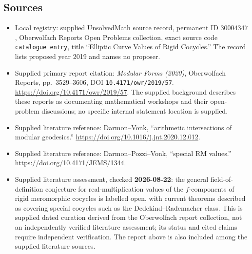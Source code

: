 \documentclass[11pt]{article}
\begin{document}
\subsection{Sources}
\begin{itemize}
\item Local registry: supplied UnsolvedMath source record, permanent ID \(30004347\), Oberwolfach Reports Open Problems collection, exact source code \texttt{catalogue entry}, title ``Elliptic Curve Values of Rigid Cocycles.'' The record lists proposed year 2019 and names no proposer.
\item Supplied primary report citation: \emph{Modular Forms (2020)}, Oberwolfach Reports, pp.\ 3529--3606, DOI \texttt{10.4171/owr/2019/57}. \url{https://doi.org/10.4171/owr/2019/57}. The supplied background describes these reports as documenting mathematical workshops and their open-problem discussions; no specific internal statement location is supplied.
\item Supplied literature reference: Darmon--Vonk, ``arithmetic intersections of modular geodesics.'' \url{https://doi.org/10.1016/j.jnt.2020.12.012}.
\item Supplied literature reference: Darmon--Pozzi--Vonk, ``special RM values.'' \url{https://doi.org/10.4171/JEMS/1344}.
\item Supplied literature assessment, checked \textbf{2026-08-22}: the general field-of-definition conjecture for real-multiplication values of the \(f\)-components of rigid meromorphic cocycles is labelled open, with current theorems described as covering special cocycles such as the Dedekind--Rademacher class. This is supplied dated curation derived from the Oberwolfach report collection, not an independently verified literature assessment; its status and cited claims require independent verification. The report above is also included among the supplied literature sources.
\end{itemize}
\end{document}
